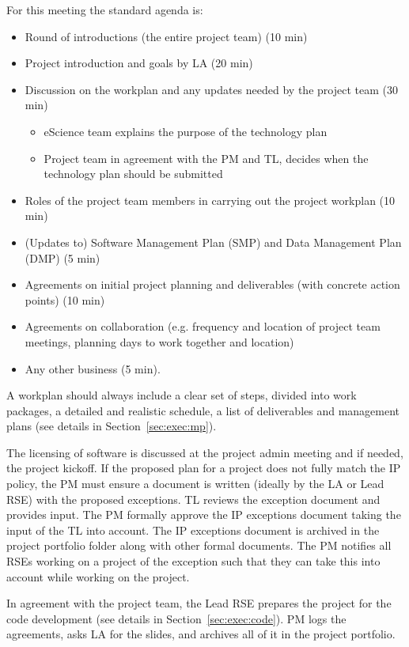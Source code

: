 For this meeting the standard agenda is:
\begin{itemize}
\item Round of introductions (the entire project team) (10 min)
\item Project introduction and goals by LA (20 min)
\item Discussion on the workplan and any updates needed by the project team (30 min)
\begin{itemize}
\item eScience team explains the purpose of the technology plan
\item Project team in agreement with the PM and TL, decides when the technology plan should be submitted
\end{itemize}
\item Roles of the project team members in carrying out the project workplan (10 min)
\item (Updates to) Software Management Plan (SMP) and Data Management Plan (DMP) (5 min)
\item Agreements on initial project planning and deliverables (with concrete action points) (10 min)
\item Agreements on collaboration (e.g. frequency and location of project team meetings, planning days to work together and
location)
\item Any other business (5 min).
\end{itemize}

A workplan should always include a clear set of steps, divided into work packages, a detailed and realistic schedule, a
list of deliverables and management plans (see details in Section~\ref{sec:exec:mp}).

The licensing of software is discussed at the project admin meeting and if needed, the project kickoff. If the proposed plan for a project does not fully match the IP policy, the PM must ensure a document is written (ideally by the LA or Lead RSE) with the proposed exceptions. TL reviews the exception document and provides input. The PM formally approve the IP exceptions document taking the input of the TL into account. 
The IP exceptions document is archived in the project portfolio folder along with other formal documents. The PM notifies all RSEs working on a project of the exception such that they can take this into account while working on the project.

In agreement with the project team, the Lead RSE prepares the project for the code development (see details in Section~\ref{sec:exec:code}). PM logs the agreements, asks LA for the slides, and archives all of it in the project
portfolio.


